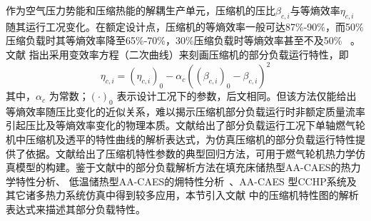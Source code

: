 作为空气压力势能和压缩热能的解耦生产单元，压缩机的压比$\beta _{c,i}$与等熵效率$\eta _{c,i}$ 随其运行工况变化。在额定设计点，压缩机的等熵效率一般可达87\%-90\%，而50\% 压缩负载时其等熵效率降至65\%-70\%，30\%压缩负载时等熵效率甚至不及50\% ~\cite{CAES-Review-18-Rui-operation}。文献
指出采用变效率方程（二次曲线）来刻画压缩机的部分负载运行特性，即
\begin{equation}
\label{equ:comp-eff-quad}
{\eta _{c,i}} = {({{\eta _{c,i}}})_0} - {\alpha _c}{({{{({{\beta _{c,i}}})}_0} - {\beta _{c,i}}})^2}
\end{equation}
其中，${\alpha _c}$ 为常数；${(\cdot)_0}$ 表示设计工况下的参数，后文相同。但该方法仅能给出等熵效率随压比变化的近似关系，难以揭示压缩机部分负载运行时非额定质量流率引起压比及等熵效率变化的物理本质。文献给出了部分负载运行工况下单轴燃气轮机中压缩机及透平的特性曲线的解析表达式，为仿真压缩机的部分负载运行特性提供了依据。文献给出了压缩机特性参数的典型回归方法，可用于燃气轮机热力学仿真模型的构建。鉴于文献中的部分负载解析方法在填充床储热型AA-CAES的热力学特性分析\cite{A-CAES-Dynamic-17}、 低温储热型AA-CAES的㶲特性分析~\cite{CHS-CAES-off-19}、AA-CAES 型CCHP系统\cite{AA-CAES-Simulation-19}及其它诸多热力系统仿真中得到较多应用，本节引入文献 中的压缩机特性图的解析表达式来描述其部分负载特性。

